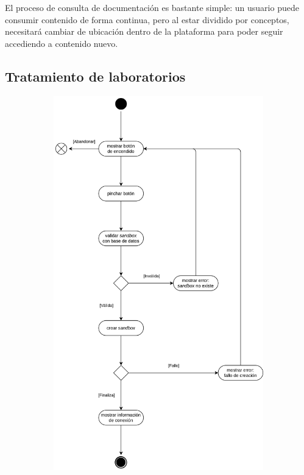             El proceso de consulta de documentación es bastante simple: un usuario puede consumir contenido de forma continua, pero al estar dividido por conceptos, necesitará cambiar de ubicación dentro de la plataforma para poder seguir accediendo a contenido nuevo.
            
            \newpage
            
        \subsection{Tratamiento de laboratorios}
        
            \begin{figure}[h]
                \centering
                
                \begin{subfigure}{0.45\textwidth}
                    \centering
                    \includegraphics[scale=0.115]{images/Diagramas/Actividades y transiciones 4.png}

\end{subfigure}
\end{figure}
